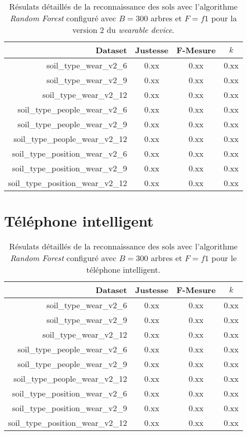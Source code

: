 \begin{table}[H]\renewcommand{\arraystretch}{0.5}
	\centering
	\caption{Résulats détaillés de la reconnaissance des sols avec l'algorithme \textit{Random Forest} configuré avec $B=300$ arbres et $F=f1$ pour la version 2 du \textit{wearable device}.}
	\label{tab:my-table}
	\begin{tabular}{@{}rccc@{}}
		\toprule
			\textbf{Dataset} & \textbf{Justesse} & \textbf{F-Mesure} & \textbf{$k$} \\
		\midrule
			soil\_type\_wear\_v2\_6 & 0.xx & 0.xx & 0.xx \\
			soil\_type\_wear\_v2\_9 & 0.xx & 0.xx & 0.xx \\
			soil\_type\_wear\_v2\_12 & 0.xx & 0.xx & 0.xx \\
			soil\_type\_people\_wear\_v2\_6 & 0.xx & 0.xx & 0.xx \\
			soil\_type\_people\_wear\_v2\_9 & 0.xx & 0.xx & 0.xx \\
			soil\_type\_people\_wear\_v2\_12 & 0.xx & 0.xx & 0.xx \\
			soil\_type\_position\_wear\_v2\_6 & 0.xx & 0.xx & 0.xx \\
			soil\_type\_position\_wear\_v2\_9 & 0.xx & 0.xx & 0.xx \\
			soil\_type\_position\_wear\_v2\_12 & 0.xx & 0.xx & 0.xx \\
		\bottomrule
	\end{tabular}
\end{table}

\section{Téléphone intelligent}

\begin{table}[H]\renewcommand{\arraystretch}{0.5}
	\centering
	\caption{Résulats détaillés de la reconnaissance des sols avec l'algorithme \textit{Random Forest} configuré avec $B=300$ arbres et $F=f1$ pour le téléphone intelligent.}
	\label{tab:my-table}
	\begin{tabular}{@{}rccc@{}}
		\toprule
			\textbf{Dataset} & \textbf{Justesse} & \textbf{F-Mesure} & \textbf{$k$} \\
		\midrule
			soil\_type\_wear\_v2\_6 & 0.xx & 0.xx & 0.xx \\
			soil\_type\_wear\_v2\_9 & 0.xx & 0.xx & 0.xx \\
			soil\_type\_wear\_v2\_12 & 0.xx & 0.xx & 0.xx \\
			soil\_type\_people\_wear\_v2\_6 & 0.xx & 0.xx & 0.xx \\
			soil\_type\_people\_wear\_v2\_9 & 0.xx & 0.xx & 0.xx \\
			soil\_type\_people\_wear\_v2\_12 & 0.xx & 0.xx & 0.xx \\
			soil\_type\_position\_wear\_v2\_6 & 0.xx & 0.xx & 0.xx \\
			soil\_type\_position\_wear\_v2\_9 & 0.xx & 0.xx & 0.xx \\
			soil\_type\_position\_wear\_v2\_12 & 0.xx & 0.xx & 0.xx \\
		\bottomrule
	\end{tabular}
\end{table}